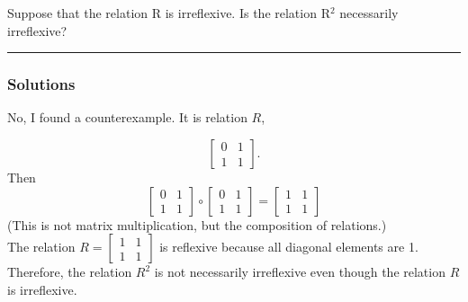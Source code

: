 \newpage
\begin{question}
Suppose that the relation R is irreflexive. Is the
relation R$^2$ necessarily irreflexive?
\end{question}

\par\noindent\rule{\textwidth}{0.5pt}

\subsubsection*{Solutions}

No, I found a counterexample. It is relation $R$,

$$
\begin{bmatrix}
0 & 1 \\
1 & 1 
\end{bmatrix}.
$$
Then $$
\begin{bmatrix}
    0 & 1 \\
    1 & 1
\end{bmatrix}
\circ
\begin{bmatrix}
    0 & 1 \\
    1 & 1
\end{bmatrix}
=
\begin{bmatrix}
    1 & 1 \\
    1 & 1
\end{bmatrix}
$$
(This is not matrix multiplication, but the composition of relations.)\\
The relation $R = \begin{bmatrix} 1 & 1 \\ 1 & 1 \end{bmatrix}$ is reflexive because all diagonal elements are 1. Therefore, the relation $R^2$ is not necessarily irreflexive even though the relation $R$ is irreflexive.\\


